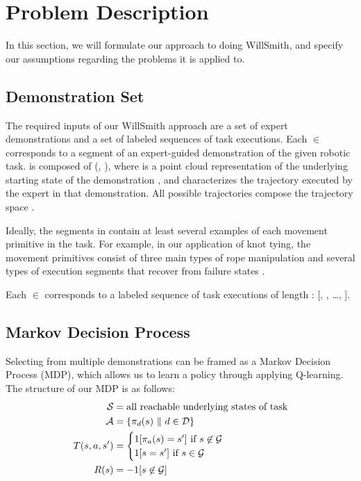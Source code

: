 \section{Problem Description}
\label{sec:formulation}
%

In this section, we will formulate our approach to doing WillSmith, and
specify our assumptions regarding the problems it is applied to.

\subsection{Demonstration Set}

The required inputs of our WillSmith approach are a set \demoset{}
of expert demonstrations and a set  of labeled sequences of
task executions.
Each \demovar{} $\in$ \demoset{} corresponds to a segment
of an expert-guided demonstration of the given robotic task.
\demovar{} is composed of (, ),
where  is a point cloud representation of the underlying
starting state of the demonstration \demovar{}, and  characterizes
the trajectory executed by the expert in that demonstration. All possible
trajectories compose the trajectory space \trajset{}.

Ideally, the segments in \demoset{} contain at least several examples
of each movement primitive in the task.
For example, in our application of knot tying, the movement primitives
consist of three main types of rope manipulation and several types of
execution segments that recover from failure states \cite{Schulmanetal_ISRR2013}.

Each  $\in$  corresponds to a labeled sequence of
task executions of length : [, , \ldots,
]. 

\subsection{Markov Decision Process}
Selecting from multiple demonstrations can be framed as a Markov Decision
Process (MDP), which allows us to learn a policy through applying Q-learning.
The structure of our MDP is as follows:
\begin{align*}
\mathcal{S}{} &=  \text{all reachable underlying states of task} \\
\mathcal{A}{} &= \{\pi_{d}(s)\ \| \text{ } d{} \in \mathcal{D}{}\} \\
T{}(s, a, s') &= \begin{cases}
                           1[\pi_{a}(s) = s'] \text{ if } s \not \in \mathcal{G}{} \\
                           1[{s}{} = {s}{}'] \text{ if } s \in \mathcal{G}{} \end{cases}\\
R(s) &= -1 {[ {s}{} \not \in \mathcal{G}{} ]} \\
\end{align*}

